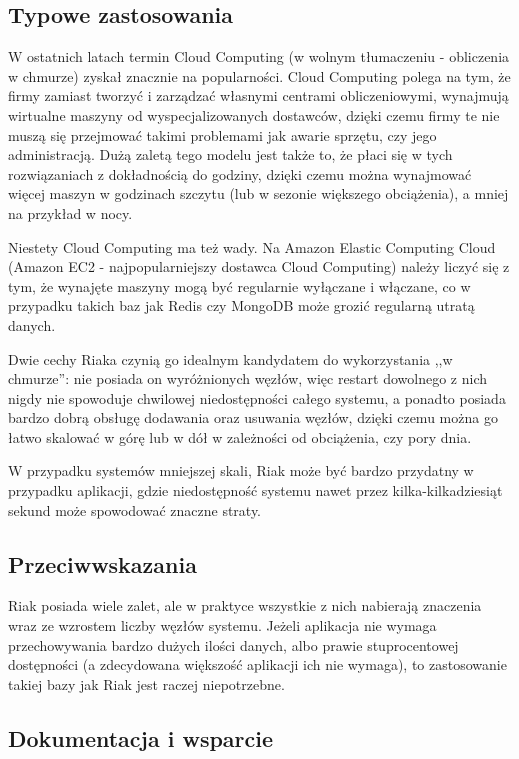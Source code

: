 \subsection*{Typowe zastosowania}

W ostatnich latach termin Cloud Computing (w wolnym tłumaczeniu - obliczenia w chmurze) zyskał znacznie na popularności.
Cloud Computing polega na tym, że firmy zamiast tworzyć i zarządzać własnymi centrami obliczeniowymi, wynajmują wirtualne maszyny od wyspecjalizowanych dostawców, dzięki czemu firmy te nie muszą się przejmować takimi problemami jak awarie sprzętu, czy jego administracją.
Dużą zaletą tego modelu jest także to, że płaci się w tych rozwiązaniach z dokładnością do godziny, dzięki czemu można wynajmować więcej maszyn w godzinach szczytu (lub w sezonie większego obciążenia), a mniej na przykład w nocy.

Niestety Cloud Computing ma też wady.
Na Amazon Elastic Computing Cloud (Amazon EC2 - najpopularniejszy dostawca Cloud Computing) należy liczyć się z tym, że wynajęte maszyny mogą być regularnie wyłączane i włączane, co w przypadku takich baz jak Redis czy MongoDB może grozić regularną utratą danych.

Dwie cechy Riaka czynią go idealnym kandydatem do wykorzystania ,,w chmurze'': nie posiada on wyróżnionych węzłów, więc restart dowolnego z nich nigdy nie spowoduje chwilowej niedostępności całego systemu, a ponadto posiada bardzo dobrą obsługę dodawania oraz usuwania węzłów, dzięki czemu można go łatwo skalować w górę lub w dół w zależności od obciążenia, czy pory dnia.

W przypadku systemów mniejszej skali, Riak może być bardzo przydatny w przypadku aplikacji, gdzie niedostępność systemu nawet przez kilka-kilkadziesiąt sekund może spowodować znaczne straty.

\subsection*{Przeciwwskazania}

Riak posiada wiele zalet, ale w praktyce wszystkie z nich nabierają znaczenia wraz ze wzrostem liczby węzłów systemu.
Jeżeli aplikacja nie wymaga przechowywania bardzo dużych ilości danych, albo prawie stuprocentowej dostępności (a zdecydowana większość aplikacji ich nie wymaga), to zastosowanie takiej bazy jak Riak jest raczej niepotrzebne.

\subsection*{Dokumentacja i wsparcie}


